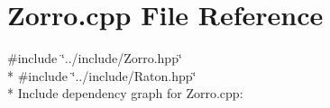 \section{Zorro.\+cpp File Reference}
\label{_zorro_8cpp}
{\ttfamily \#include \char`\"{}../include/\+Zorro.\+hpp\char`\"{}}\\*
{\ttfamily \#include \char`\"{}../include/\+Raton.\+hpp\char`\"{}}\\*
Include dependency graph for Zorro.\+cpp\+:
